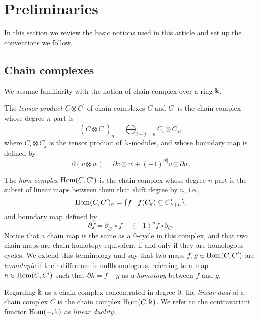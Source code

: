 
\section{Preliminaries} \label{s:preliminaries}

In this section we review the basic notions used in this article and set up the conventions we follow.

\subsection{Chain complexes}

We assume familiarity with the notion of chain complex over a ring $\Bbbk$.

The \textit{tensor product} $C \otimes C^\prime$ of chain complexes $C$ and $C^\prime$ is the chain complex whose degree-$n$ part is
\begin{equation*}
\left(C \otimes C^\prime\right)_n = \bigoplus_{i+j=n} C_i \otimes C^\prime_j,
\end{equation*}
where $C_i \otimes C^\prime_j$ is the tensor product of $\Bbbk$-modules, and whose boundary map is defined by
\begin{equation*}
\partial (v \otimes w) = \partial v \otimes w + (-1)^{|v|} v \otimes \partial w.
\end{equation*}

The \textit{hom complex} $\mathrm{Hom}(C, C^\prime)$ is the chain complex whose degree-$n$ part is the subset of linear maps between them that shift degree by $n$, i.e.,
\begin{equation*}
\mathrm{Hom}(C, C^\prime)_n = \{f \mid f(C_k) \subseteq C^\prime_{k+n}\},
\end{equation*}
and boundary map defined by
\begin{equation*}
\partial f = \partial_{C^\prime} \circ f - (-1)^{n} f \circ \partial_C.
\end{equation*}
Notice that a chain map is the same as a $0$-cycle in this complex, and that two chain maps are chain homotopy equivalent if and only if they are homologous cycles.
We extend this terminology and say that two maps $f, g \in \mathrm{Hom}(C, C^\prime)$ are \textit{homotopic} if their difference is nullhomologous, referring to a map $h \in \mathrm{Hom}(C, C^\prime)$ such that $\partial h = f - g$ as a \textit{homotopy} between $f$ and $g$.

Regarding $\Bbbk$ as a chain complex concentrated in degree $0$, the \textit{linear dual} of a chain complex $C$ is the chain complex $\mathrm{Hom}(C, \Bbbk)$.
We refer to the contravariant functor $\mathrm{Hom}(-, \Bbbk)$ as \textit{linear duality}.

